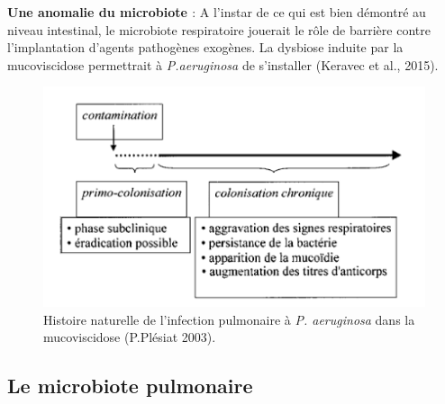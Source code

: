 \documentclass[12pt,a4paper]{article}
\begin{document}
\textbf{Une anomalie du microbiote \cite{HoMan2017}}:
A l'instar de ce qui est bien démontré au niveau intestinal, le microbiote respiratoire jouerait le rôle de barrière contre l'implantation d'agents pathogènes exogènes. La dysbiose induite par la mucoviscidose permettrait à \textit{P.aeruginosa} de s'installer (Keravec et al., 2015).


\begin{figure}[ht]
\begin{center}
\includegraphics[scale=0.8]{img/chronic.png}\hfill
\end{center}
\caption{Histoire naturelle de l'infection pulmonaire à \textit{P. aeruginosa} dans la mucoviscidose (P.Plésiat 2003\cite{Plesiat}).}
\label{bach}
\end{figure}


\subsection{Le microbiote pulmonaire}
\end{document}
